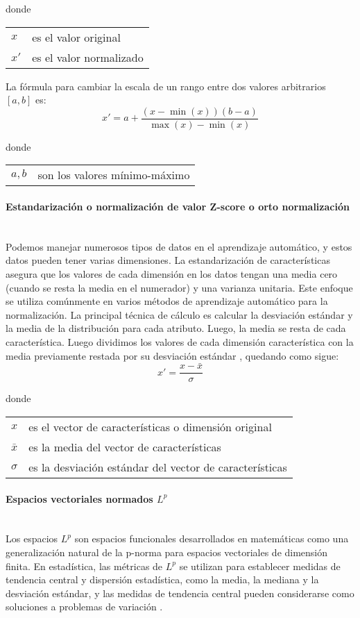 \documentclass[12pt]{article}
\makeatletter
\newcommand{\subsubsubsection}[1]{\paragraph{#1}\mbox{}\\}
\newenvironment{conditions}
{\par\vspace{\abovedisplayskip}\noindent\begin{tabular}{>{$}l<{$} @{${}={}$} l}}
	{\end{tabular}\par\vspace{\belowdisplayskip}}
\makeatother
\begin{document}
			donde
			\begin{conditions}
			x   &  es el valor original \\   
			x'  &  es el valor normalizado
			\end{conditions}
			
			La fórmula para cambiar la escala de un rango entre dos valores arbitrarios $[a, b]$ es:	
			\begin{equation}\label{eq:Min_Max_scaler_entre_a_y_b}
			x'= a + \frac{(x - \min(x))(b-a)}{\max(x)-\min(x)}
			\end{equation}
						
			donde
			\begin{conditions}
			a,b   &  son los valores mínimo-máximo
			\end{conditions}
			

			\subsubsubsection{Estandarización o normalización de valor Z-score o orto normalización}
			Podemos manejar numerosos tipos de datos en el aprendizaje automático, y estos datos pueden tener varias dimensiones. La estandarización de características asegura que los valores de cada dimensión en los datos tengan una media cero (cuando se resta la media en el numerador) y una varianza unitaria. Este enfoque se utiliza comúnmente en varios métodos de aprendizaje automático para la normalización. La principal técnica de cálculo es calcular la desviación estándar y la media de la distribución para cada atributo. Luego, la media se resta de cada característica. Luego dividimos los valores de cada dimensión característica con la media previamente restada por su desviación estándar \cite{Fouad2020}, quedando como sigue:
			\begin{equation}\label{eq:Normalizacion_de_valor_Z-score}
			x' = \frac{x - \bar{x}}{\sigma}
			\end{equation}
			
			donde
			\begin{conditions}
			x        &  es el vector de características o dimensión original \\   
			\bar{x}  &  es la media del vector de características \\
			\sigma   & es la desviación estándar del vector de características
			\end{conditions}
						
			\subsubsubsection{Espacios vectoriales normados $L^p$}
			Los espacios $L^p$ son espacios funcionales desarrollados en matemáticas como una generalización natural de la p-norma para espacios vectoriales de dimensión finita. En estadística, las métricas de $L^p$ se utilizan para establecer medidas de tendencia central y dispersión estadística, como la media, la mediana y la desviación estándar, y las medidas de tendencia central pueden considerarse como soluciones a problemas de variación \cite{Dhinu2021}.
			
\end{document}
